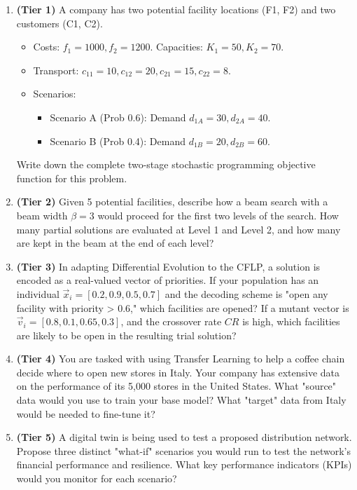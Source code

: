 \documentclass{article}
\begin{document}
\begin{enumerate}
    \item \textbf{(Tier 1)} A company has two potential facility locations (F1, F2) and two customers (C1, C2). 
        \begin{itemize}
            \item Costs: $f_1=1000, f_2=1200$. Capacities: $K_1=50, K_2=70$.
            \item Transport: $c_{11}=10, c_{12}=20, c_{21}=15, c_{22}=8$.
            \item Scenarios:
                \begin{itemize}
                    \item Scenario A (Prob 0.6): Demand $d_{1A}=30, d_{2A}=40$.
                    \item Scenario B (Prob 0.4): Demand $d_{1B}=20, d_{2B}=60$.
                \end{itemize}
        \end{itemize}
        Write down the complete two-stage stochastic programming objective function for this problem.

    \item \textbf{(Tier 2)} Given 5 potential facilities, describe how a beam search with a beam width $\beta=3$ would proceed for the first two levels of the search. How many partial solutions are evaluated at Level 1 and Level 2, and how many are kept in the beam at the end of each level?
    
    \item \textbf{(Tier 3)} In adapting Differential Evolution to the CFLP, a solution is encoded as a real-valued vector of priorities. If your population has an individual $\vec{x}_i = [0.2, 0.9, 0.5, 0.7]$ and the decoding scheme is "open any facility with priority > 0.6," which facilities are opened? If a mutant vector is $\vec{v}_i = [0.8, 0.1, 0.65, 0.3]$, and the crossover rate $CR$ is high, which facilities are likely to be open in the resulting trial solution?
    
    \item \textbf{(Tier 4)} You are tasked with using Transfer Learning to help a coffee chain decide where to open new stores in Italy. Your company has extensive data on the performance of its 5,000 stores in the United States. What "source" data would you use to train your base model? What "target" data from Italy would be needed to fine-tune it?
    
    \item \textbf{(Tier 5)} A digital twin is being used to test a proposed distribution network. Propose three distinct "what-if" scenarios you would run to test the network's financial performance and resilience. What key performance indicators (KPIs) would you monitor for each scenario?
    

\end{enumerate}
\end{document}
